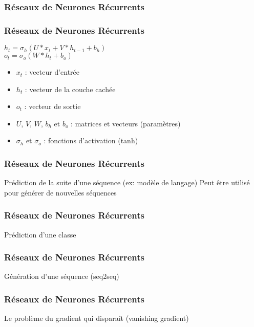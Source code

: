 \begin{frame}
  \frametitle{Réseaux de Neurones Récurrents}
\end{frame}

\begin{frame}
  \frametitle{Réseaux de Neurones Récurrents}
  $h_{t}=\sigma_{h}(U*x_{t}+V*h_{t-1}+b_{h})$ \\
  $o_{t}=\sigma_{o}(W*h_{t}+b_{o})$ \\
  \begin{itemize}
  \item $x_{t}$ : vecteur d'entrée
  \item $h_t$ : vecteur de la couche cachée
  \item $o_{t}$ : vecteur de sortie
  \item $U$, $V$, $W$, $b_h$ et $b_o$ : matrices et vecteurs (paramètres)
  \item $\sigma_{h}$ et $\sigma_o$ : fonctions d'activation (tanh)
  \end{itemize}
\end{frame}

\begin{frame}
  \frametitle{Réseaux de Neurones Récurrents}
  Prédiction de la suite d'une séquence (ex: modèle de langage)
  Peut être utilisé pour générer de nouvelles séquences
\end{frame}

\begin{frame}
  \frametitle{Réseaux de Neurones Récurrents}
  Prédiction d'une classe
\end{frame}

\begin{frame}
  \frametitle{Réseaux de Neurones Récurrents}
  Génération d'une séquence (seq2seq)
\end{frame}

\begin{frame}
  \frametitle{Réseaux de Neurones Récurrents}
  Le problème du gradient qui disparaît (vanishing gradient)
\end{frame}
